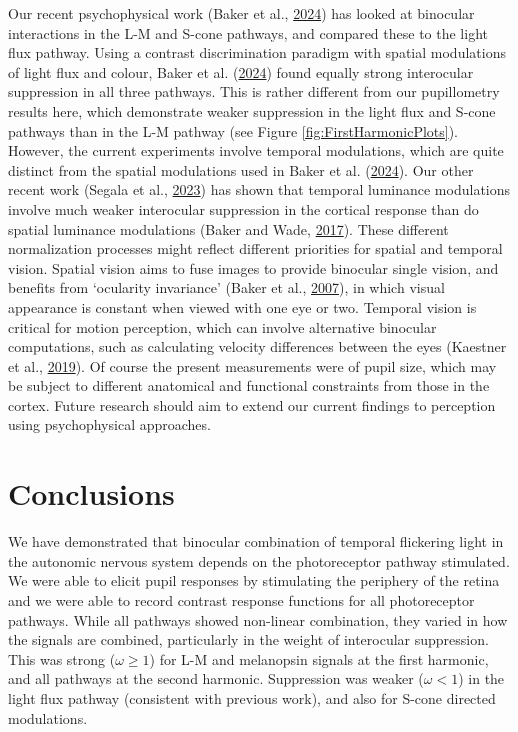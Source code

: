 \documentclass[
]{article}
\begin{document}
Our recent psychophysical work (Baker et al., \protect\hyperlink{ref-Baker2024}{2024}) has looked at binocular interactions in the L-M and S-cone pathways, and compared these to the light flux pathway. Using a contrast discrimination paradigm with spatial modulations of light flux and colour, Baker et al. (\protect\hyperlink{ref-Baker2024}{2024}) found equally strong interocular suppression in all three pathways. This is rather different from our pupillometry results here, which demonstrate weaker suppression in the light flux and S-cone pathways than in the L-M pathway (see Figure \ref{fig:FirstHarmonicPlots}). However, the current experiments involve temporal modulations, which are quite distinct from the spatial modulations used in Baker et al. (\protect\hyperlink{ref-Baker2024}{2024}). Our other recent work (Segala et al., \protect\hyperlink{ref-Segala2023}{2023}) has shown that temporal luminance modulations involve much weaker interocular suppression in the cortical response than do spatial luminance modulations (Baker and Wade, \protect\hyperlink{ref-Baker2017}{2017}). These different normalization processes might reflect different priorities for spatial and temporal vision. Spatial vision aims to fuse images to provide binocular single vision, and benefits from `ocularity invariance' (Baker et al., \protect\hyperlink{ref-Baker2007}{2007}), in which visual appearance is constant when viewed with one eye or two. Temporal vision is critical for motion perception, which can involve alternative binocular computations, such as calculating velocity differences between the eyes (Kaestner et al., \protect\hyperlink{ref-Kaestner2019}{2019}). Of course the present measurements were of pupil size, which may be subject to different anatomical and functional constraints from those in the cortex. Future research should aim to extend our current findings to perception using psychophysical approaches.

\hypertarget{conclusions}{%
\section{Conclusions}\label{conclusions}}

We have demonstrated that binocular combination of temporal flickering light in the autonomic nervous system depends on the photoreceptor pathway stimulated. We were able to elicit pupil responses by stimulating the periphery of the retina and we were able to record contrast response functions for all photoreceptor pathways. While all pathways showed non-linear combination, they varied in how the signals are combined, particularly in the weight of interocular suppression. This was strong (\(\omega \ge 1\)) for L-M and melanopsin signals at the first harmonic, and all pathways at the second harmonic. Suppression was weaker (\(\omega < 1\)) in the light flux pathway (consistent with previous work), and also for S-cone directed modulations.
\end{document}
